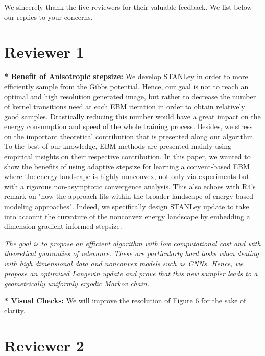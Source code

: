 \documentclass[letterpaper]{article} %
\begin{document}
We sincerely thank the five reviewers for their valuable feedback. 
We list below our replies to your concerns.

\vspace{-0.1in}
\section{Reviewer 1}




\noindent \textbf{* Benefit of Anisotropic stepsize:} 
We develop STANLey in order to more efficiently sample from the Gibbs potential. Hence, our goal is not to reach an optimal and high resolution generated image, but rather to decrease the number of kernel transitions need at each EBM iteration in order to obtain relatively good samples.
Drastically reducing this number would have a great impact on the energy consumption and speed of the whole training process.
Besides, we stress on the important theoretical contribution that is presented along our algorithm. 
To the best of our knowledge, EBM methods are presented mainly using empirical insights on their respective contribution.
In this paper, we wanted to show the benefits of using adaptive stepsize for learning a convent-based EBM where the energy landscape is highly nonconvex, not only via experiments but with a rigorous non-asymptotic convergence analysis.
This also echoes with R4's remark on "how the approach fits within the broader landscape of energy-based modeling approaches".
Indeed, we specifically design STANLey update to take into account the curvature of the nonconvex energy landscape by embedding a dimension gradient informed stepsize.

\textit{The goal is to propose an efficient algorithm with low computational cost and with theoretical guaranties of relevance.
These are particularly hard tasks when dealing with high dimensional data and nonconvex models such as CNNs.
Hence, we propose an optimized Langevin update and prove that this new sampler leads to a geometrically uniformly ergodic Markov chain.}

\noindent \textbf{* Visual Checks:} 
We will improve the resolution of Figure 6 for the sake of clarity.

\vspace{-0.1in}
\section{Reviewer 2}
\end{document}
